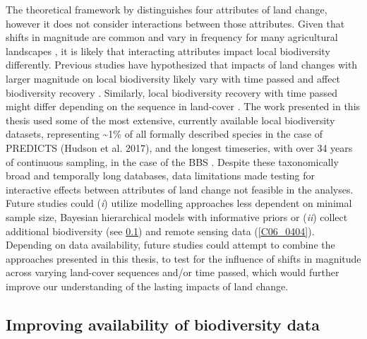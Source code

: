 The theoretical framework by \cite{Watson2014} distinguishes four attributes of land change, however it does not consider interactions between those attributes. Given that shifts in magnitude are common and vary in frequency for many agricultural landscapes \citep{Kleyer2007}, it is likely that interacting attributes impact local biodiversity differently. Previous studies have hypothesized that impacts of land changes with larger magnitude on local biodiversity likely vary with time passed and affect biodiversity recovery \citep{Shackelford2017}. Similarly, local biodiversity recovery with time passed might differ depending on the sequence in land-cover \citep{Chazdon2003,Martin2013}. The work presented in this thesis used some of the most extensive, currently available local biodiversity datasets, representing \textasciitilde 1\% of all formally described species in the case of PREDICTS \citep{Hudson2016}(Hudson et al. 2017), and the longest timeseries, with over 34 years of continuous sampling, in the case of the BBS \citep[, Figure \ref{F01_01}]{Pardieck2018}. Despite these taxonomically broad and temporally long databases, data limitations made testing for interactive effects between attributes of land change not feasible in the analyses. Future studies could (\textit{i}) utilize modelling approaches less dependent on minimal sample size, \eg Bayesian hierarchical models with informative priors \citep{Iknayan2014} or (\textit{ii}) collect additional biodiversity (see \ref{C06_0403}) and remote sensing data (\ref{C06_0404}). Depending on data availability, future studies could attempt to combine the approaches presented in this thesis, \ie to test for the influence of shifts in magnitude across varying land-cover sequences and/or time passed, which would further improve our understanding of the lasting impacts of land change.

\subsection{Improving availability of biodiversity data}
\label{C06_0403}

